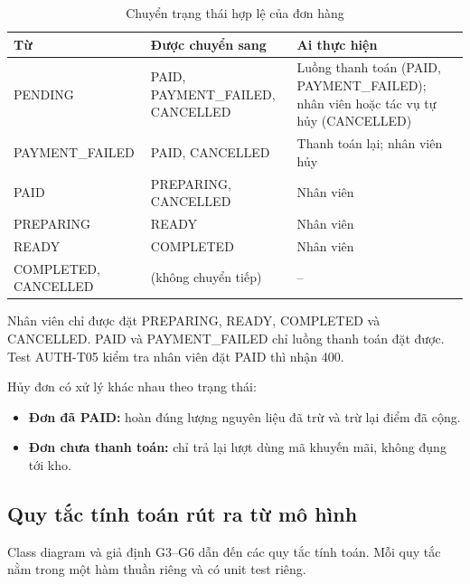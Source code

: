 \begin{table}[H]
\centering
\caption{Chuyển trạng thái hợp lệ của đơn hàng}\label{tab:state}
\begin{tabular}{@{}L{3.4cm}L{5cm}L{5.4cm}@{}}
\toprule
\textbf{Từ} & \textbf{Được chuyển sang} & \textbf{Ai thực hiện} \\ \midrule
PENDING & PAID, PAYMENT\_FAILED, CANCELLED & Luồng thanh toán (PAID, PAYMENT\_FAILED); nhân viên hoặc tác vụ tự hủy (CANCELLED) \\
PAYMENT\_FAILED & PAID, CANCELLED & Thanh toán lại; nhân viên hủy \\
PAID & PREPARING, CANCELLED & Nhân viên \\
PREPARING & READY & Nhân viên \\
READY & COMPLETED & Nhân viên \\
COMPLETED, CANCELLED & (không chuyển tiếp) & -- \\
\bottomrule
\end{tabular}
\end{table}

Nhân viên chỉ được đặt PREPARING, READY, COMPLETED và CANCELLED. PAID và PAYMENT\_FAILED chỉ luồng thanh toán đặt được. Test AUTH-T05 kiểm tra nhân viên đặt PAID thì nhận 400.

Hủy đơn có xử lý khác nhau theo trạng thái:
\begin{itemize}
\item \textbf{Đơn đã PAID:} hoàn đúng lượng nguyên liệu đã trừ và trừ lại điểm đã cộng.
\item \textbf{Đơn chưa thanh toán:} chỉ trả lại lượt dùng mã khuyến mãi, không đụng tới kho.
\end{itemize}

\subsection{Quy tắc tính toán rút ra từ mô hình}
Class diagram và giả định G3--G6 dẫn đến các quy tắc tính toán. Mỗi quy tắc nằm trong một hàm thuần riêng và có unit test riêng.

